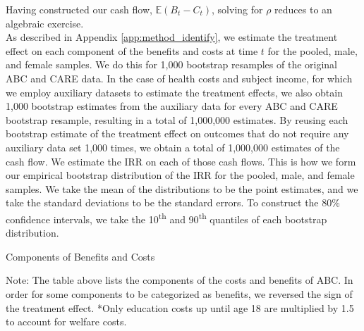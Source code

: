 \noindent Having constructed our cash flow, $\mathbb{E} (B_t - C_t)$, solving for $\rho$
reduces to an algebraic exercise. \\

\noindent As described in Appendix \ref{app:method_identify}, we estimate the treatment effect on each
component of the benefits and costs at time $t$ for the pooled, male, and
female samples. We do this for 1,000 bootstrap resamples of the original ABC and CARE data.
In the case of health costs and subject income, for which we employ auxiliary datasets to
estimate the treatment effects, we also obtain 1,000 bootstrap estimates from the auxiliary data
for every ABC and CARE bootstrap resample, resulting in a total of 1,000,000 estimates.
By reusing each bootstrap estimate of the treatment effect on outcomes that do not require any auxiliary data
set 1,000 times, we obtain a total of 1,000,000 estimates of the cash flow.
We estimate the IRR on each of those cash flows.
This is how we form our empirical bootstrap distribution of the IRR for the pooled, male, and female samples.
We take the mean of the distributions to be the point estimates, and we take the standard deviations
to be the standard errors. To construct the 80\% confidence intervals, we take the 10\textsuperscript{th}
and 90\textsuperscript{th} quantiles of each bootstrap distribution. \\

\begin{table}[H]
\begin{threeparttable}
\caption{Components of Benefits and Costs}
\label{table:bc_comp}
\centering

\begin{tablenotes}
\tiny
\item Note: The table above lists the components of the costs and benefits of ABC.
In order for some components to be categorized as benefits, we reversed the sign
of the treatment effect. *Only education costs up until age 18 are multiplied by 1.5 to account for welfare costs.
\end{tablenotes}
\end{threeparttable}
\end{table}





